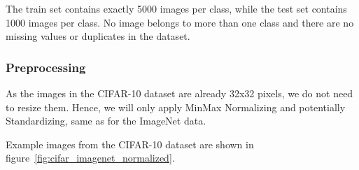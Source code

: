 The train set contains exactly 5000 images per class, while the test set contains 1000 images per class.
No image belongs to more than one class and there are no missing values or duplicates in the dataset.

\subsubsection{Preprocessing}
As the images in the CIFAR-10 dataset are already 32x32 pixels, we do not need to resize them.
Hence, we will only apply MinMax Normalizing and potentially Standardizing, same as for the ImageNet data.

Example images from the CIFAR-10 dataset are shown in figure~\ref{fig:cifar_imagenet_normalized}.
